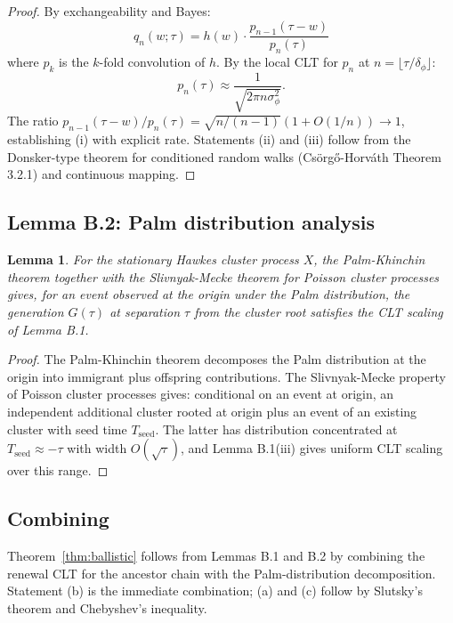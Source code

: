 \documentclass[11pt,a4paper]{article}
\newtheorem{lemma}[theorem]{Lemma}
\begin{document}
\begin{proof}
By exchangeability and Bayes:
\begin{equation}
q_n(w; \tau) = h(w) \cdot \frac{p_{n-1}(\tau - w)}{p_n(\tau)}
\end{equation}
where $p_k$ is the $k$-fold convolution of $h$. By the local CLT \cite{Petrov1975} for $p_n$ at $n = \lfloor\tau/\delta_\phi\rfloor$:
\begin{equation}
p_n(\tau) \approx \frac{1}{\sqrt{2\pi n\sigma_\phi^2}}.
\end{equation}
The ratio $p_{n-1}(\tau-w)/p_n(\tau) = \sqrt{n/(n-1)}(1 + O(1/n)) \to 1$, establishing (i) with explicit rate. Statements (ii) and (iii) follow from the Donsker-type theorem for conditioned random walks (Csörgő-Horváth Theorem 3.2.1) and continuous mapping.
\end{proof}

\subsection{Lemma B.2: Palm distribution analysis}

\begin{lemma}
For the stationary Hawkes cluster process $X$, the Palm-Khinchin theorem \cite{DaleyVereJones2003} together with the Slivnyak-Mecke theorem for Poisson cluster processes gives, for an event observed at the origin under the Palm distribution, the generation $G(\tau)$ at separation $\tau$ from the cluster root satisfies the CLT scaling of Lemma B.1.
\end{lemma}

\begin{proof}
The Palm-Khinchin theorem decomposes the Palm distribution at the origin into immigrant plus offspring contributions. The Slivnyak-Mecke property of Poisson cluster processes gives: conditional on an event at origin, an independent additional cluster rooted at origin plus an event of an existing cluster with seed time $T_{\mathrm{seed}}$. The latter has distribution concentrated at $T_{\mathrm{seed}} \approx -\tau$ with width $O(\sqrt{\tau})$, and Lemma B.1(iii) gives uniform CLT scaling over this range.
\end{proof}

\subsection{Combining}

Theorem~\ref{thm:ballistic} follows from Lemmas B.1 and B.2 by combining the renewal CLT for the ancestor chain with the Palm-distribution decomposition. Statement (b) is the immediate combination; (a) and (c) follow by Slutsky's theorem and Chebyshev's inequality.
\end{document}
